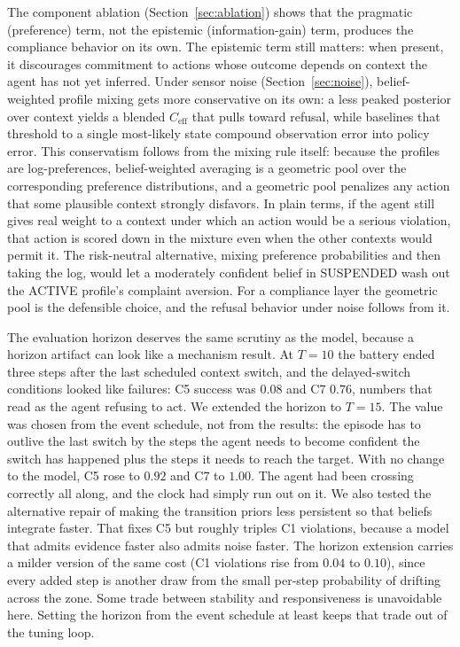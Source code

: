 \documentclass[10pt,twocolumn]{article}
\begin{document}
The component ablation (Section~\ref{sec:ablation}) shows that the pragmatic (preference) term, not the epistemic (information-gain) term, produces the compliance behavior on its own. The epistemic term still matters: when present, it discourages commitment to actions whose outcome depends on context the agent has not yet inferred. Under sensor noise (Section~\ref{sec:noise}), belief-weighted profile mixing gets more conservative on its own: a less peaked posterior over context yields a blended $C_{\text{eff}}$ that pulls toward refusal, while baselines that threshold to a single most-likely state compound observation error into policy error. This conservatism follows from the mixing rule itself: because the profiles are log-preferences, belief-weighted averaging is a geometric pool over the corresponding preference distributions, and a geometric pool penalizes any action that some plausible context strongly disfavors. In plain terms, if the agent still gives real weight to a context under which an action would be a serious violation, that action is scored down in the mixture even when the other contexts would permit it. The risk-neutral alternative, mixing preference probabilities and then taking the log, would let a moderately confident belief in SUSPENDED wash out the ACTIVE profile's complaint aversion. For a compliance layer the geometric pool is the defensible choice, and the refusal behavior under noise follows from it.

The evaluation horizon deserves the same scrutiny as the model, because a horizon artifact can look like a mechanism result. At $T = 10$ the battery ended three steps after the last scheduled context switch, and the delayed-switch conditions looked like failures: C5 success was $0.08$ and C7 $0.76$, numbers that read as the agent refusing to act. We extended the horizon to $T = 15$. The value was chosen from the event schedule, not from the results: the episode has to outlive the last switch by the steps the agent needs to become confident the switch has happened plus the steps it needs to reach the target. With no change to the model, C5 rose to $0.92$ and C7 to $1.00$. The agent had been crossing correctly all along, and the clock had simply run out on it. We also tested the alternative repair of making the transition priors less persistent so that beliefs integrate faster. That fixes C5 but roughly triples C1 violations, because a model that admits evidence faster also admits noise faster. The horizon extension carries a milder version of the same cost (C1 violations rise from $0.04$ to $0.10$), since every added step is another draw from the small per-step probability of drifting across the zone. Some trade between stability and responsiveness is unavoidable here. Setting the horizon from the event schedule at least keeps that trade out of the tuning loop.
\end{document}
